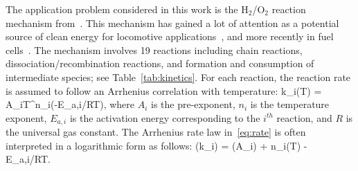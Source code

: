 The application problem considered in this work is the
H$_2$/O$_2$ reaction mechanism from~\cite{Yetter:1991}. This mechanism has gained
a lot of attention as a potential source of clean energy for
locomotive applications~\cite{Das:1996}, and more recently in fuel
 cells~\cite{Loges:2008,Cosnier:2016}. 
The mechanism involves 19
reactions including chain reactions, dissociation/recombination reactions, and
formation and consumption of intermediate species; see Table~\ref{tab:kinetics}. 
For each reaction, the reaction rate is assumed to follow an Arrhenius
correlation with temperature:
%
\be
k_i(T) = A_iT^{n_i}\exp(-E_{a,i}/RT), 
\label{eq:rate}
\ee
%
where $A_i$ is the pre-exponent, $n_i$ is the temperature
exponent, $E_{a,i}$ is the
activation energy corresponding to the $i^{th}$ reaction, and $R$ is the
universal gas constant.  The Arrhenius rate law in~\eqref{eq:rate} 
is often interpreted in a logarithmic form as follows:
%
\be
\log(k_i) = \log(A_i) + n_i\log(T) - E_{a,i}/RT. 
\label{eq:ratelog}
\ee
%
%
